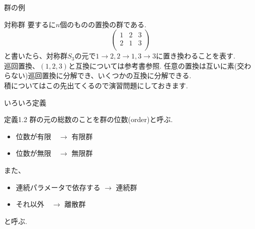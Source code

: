 \documentclass[dvipdfmx,11pt,notheorems]{beamer}
\begin{document}
\begin{frame}{群の例}
  \begin{exampleblock}{対称群}
    要するに$n$個のものの置換の群である. \\
    \begin{equation*}
      \begin{pmatrix}
        1 & 2 & 3 \\
        2 & 1 & 3 \\
      \end{pmatrix}
    \end{equation*}
    と書いたら、対称群$S_3$の元で$1\rightarrow 2,2\rightarrow1,3\rightarrow3$に置き換わることを表す. \\
    \alert{巡回置換}、$(1,2,3)$と互換については参考書参照. 任意の置換は互いに素(交わらない)巡回置換に分解でき、いくつかの互換に分解できる. \\
    積についてはこの先出てくるので演習問題にしておきます.
  \end{exampleblock}
\end{frame}
\begin{frame}{いろいろ定義}
  \begin{block}{定義1.2}
    群の元の総数のことを群の\alert{位数}(order)と呼ぶ.
    \begin{itemize}
      \item 位数が有限　$\rightarrow$ \alert{有限群}
      \item 位数が無限　$\rightarrow$ \alert{無限群}
    \end{itemize}
    また、
    \begin{itemize}
      \item 連続パラメータで依存する $\rightarrow$ \alert{連続群}
      \item それ以外　$\rightarrow$ \alert{離散群}
    \end{itemize}
    と呼ぶ.
  \end{block}
\end{frame}
\end{document}
